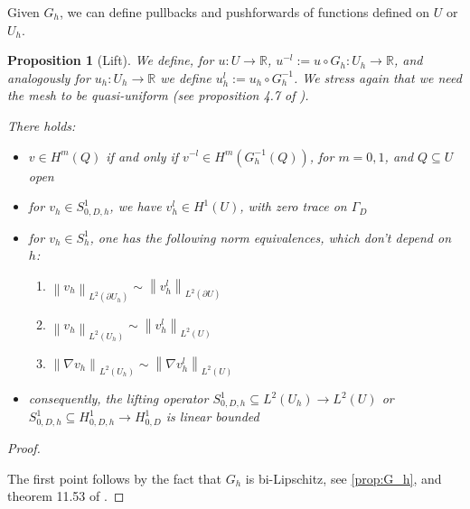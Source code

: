 \documentclass[english,a4paper,9pt,oneside]{scrbook}	%
\theoremstyle{break}
\newtheorem{prop}[equation]{Proposition}
\newenvironment{mproof}[1][\proofname]{%
  \begin{proof}[#1]$ $\par\nobreak\ignorespaces
}{%
  \end{proof}
}
\renewcommand*{\proofname}{Proof}
\theoremstyle{remark}
\newcommand{\mR}{\mathbb{R}}
\newcommand{\norm}[1]{\left\lVert#1\right\rVert}
\begin{document}
\begin{appendices}
Given $G_h$, we can define pullbacks and pushforwards of functions defined on $U$ or $U_h$.


\begin{prop}[Lift]
\label{prop:lift}
We define, for $u: U \rightarrow \mR$, $u^{-l}:=u\circ G_h : U_h \rightarrow \mR$, and analogously for $u_h: U_h \rightarrow \mR$ we define $u_h^l:=u_h\circ G_h^{-1}$. We stress again that we need the mesh to be quasi-uniform (see proposition 4.7 of \cite{elliott}).

There holds:

\begin{itemize}
	\item $v\in H^m(Q)$ if and only if $v^{-l} \in H^m(G_h^{-1}(Q))$, for $m=0,1$, and $Q\subseteq U$ open
	\item for $v_h \in S^1_{0,D,h}$, we have $v_h^l \in H^1(U)$, with zero trace on $\Gamma_D$ 
	\item for $v_h  \in S^1_h$, one has the following norm equivalences, which don't depend on $h$:
	\begin{enumerate}
		\item $\norm{v_h}_{L^2(\partial U_h)} \sim \norm{v_h^l}_{L^2(\partial U)}$
		\item $\norm{v_h}_{L^2( U_h)} \sim \norm{v_h^l}_{L^2( U)}$
		\item $\norm{\nabla v_h}_{L^2( U_h)} \sim \norm{\nabla v_h^l}_{L^2( U)}$
	\end{enumerate}
	\item consequently, the lifting operator $S^{1}_{0,D,h} \subseteq L^2(U_h) \rightarrow L^2(U)$ or $S^{1}_{0,D,h} \subseteq H^1_{0,D,h} \rightarrow H^1_{0,D}$ is linear bounded
	
\end{itemize}

\end{prop}

\begin{mproof}

The first point follows by the fact that $G_h$ is bi-Lipschitz, see \cref{prop:G_h}, and theorem 11.53 of \cite{leoni}.

%
%


\end{mproof}
\end{appendices}
\end{document}
